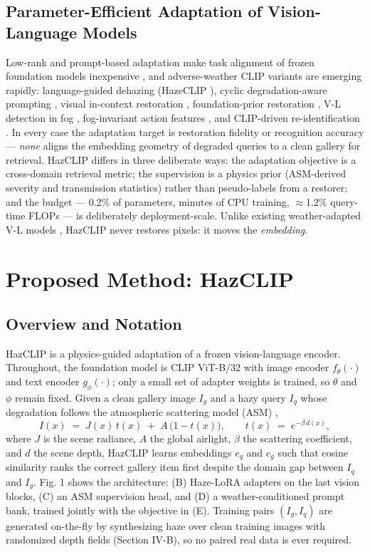 \documentclass[journal]{IEEEtran}
\begin{document}
\subsection{Parameter-Efficient Adaptation of Vision-Language Models}
Low-rank and prompt-based adaptation make task alignment of frozen
foundation models inexpensive \cite{yang2024loradepth,li2025icpl,tian2026wpd},
and adverse-weather CLIP variants are emerging rapidly: language-guided
dehazing (HazeCLIP \cite{wang2024hazeclip}), cyclic degradation-aware
prompting \cite{liao2025cyclicprompt}, visual in-context restoration
\cite{rajagopalan2024awracle}, foundation-prior restoration
\cite{tan2023idr}, V-L detection in fog \cite{chen2026dawdetr},
fog-invariant action features \cite{liu2026fogaction}, and CLIP-driven
re-identification \cite{yan2023clipreid}. In every case the adaptation
target is restoration fidelity or recognition accuracy --- \emph{none} aligns the
embedding geometry of degraded queries to a clean gallery for retrieval.
HazCLIP differs in three deliberate ways: the adaptation objective is a
cross-domain retrieval metric; the supervision is a physics prior
(ASM-derived severity and transmission statistics) rather than pseudo-labels
from a restorer; and the budget --- 0.2\% of parameters, minutes of CPU
training, $\approx$1.2\% query-time FLOPs --- is deliberately deployment-scale.
Unlike existing weather-adapted V-L models
\cite{wang2024hazeclip,chen2026dawdetr}, HazCLIP never restores pixels:
it moves the \emph{embedding}.

\section{Proposed Method: HazCLIP}
\subsection{Overview and Notation}
HazCLIP is a physics-guided adaptation of a frozen vision-language encoder.
Throughout, the foundation model is CLIP ViT-B/32 \cite{radford2021clip}
with image encoder $f_\theta(\cdot)$ and text encoder
$g_\phi(\cdot)$; only a small set of adapter weights is trained, so
$\theta$ and $\phi$ remain fixed. Given a clean gallery image $I_g$ and a
hazy query $I_q$ whose degradation follows the atmospheric scattering model
(ASM) \cite{he2010dcp,li2018reside},
\begin{equation*}I(x) \;=\; J(x)\,t(x) \;+\; A\,\bigl(1 - t(x)\bigr), \qquad
t(x) \;=\; e^{-\beta\, d(x)},
\tag{1}\end{equation*}
where $J$ is the scene radiance, $A$ the global airlight, $\beta$ the
scattering coefficient, and $d$ the scene depth, HazCLIP learns embeddings
$e_q$ and $e_g$ such that cosine similarity ranks the correct gallery item
first despite the domain gap between $I_q$ and $I_g$. Fig. 1 shows the
architecture: (B) Haze-LoRA adapters on the last vision blocks, (C) an ASM
supervision head, and (D) a weather-conditioned prompt bank, trained jointly
with the objective in (E). Training pairs $(I_g, I_q)$ are generated
on-the-fly by synthesizing haze over clean training images with randomized
depth fields (Section IV-B), so no paired real data is ever required.
\end{document}
